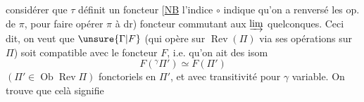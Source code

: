 considérer que  $\tau$  définit un foncteur
[\uline{NB} l'indice $\circ$ indique qu'on a renversé les op. de $\pi$, pour faire opérer $\pi$ à dr)
foncteur commutant aux $\varinjlim$ quelconques. Ceci dit, on veut que $\unsure{\Gamma|F}$ (qui opère sur $\operatorname{Rev}(\Pi)$ via ses opérations sur $\Pi$) soit compatible avec le foncteur $F$, i.e. qu'on ait des isom
\[
F({}^{\gamma}\Pi')\simeq F(\Pi')
\]
$(\Pi'\in\operatorname{Ob}\operatorname{Rev}\Pi)$ fonctoriels en $\Pi'$, et avec transitivité pour $\gamma$ variable. On trouve que celà signifie
